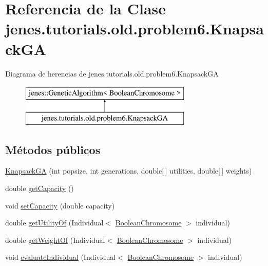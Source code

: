 \hypertarget{classjenes_1_1tutorials_1_1old_1_1problem6_1_1_knapsack_g_a}{\section{Referencia de la Clase jenes.\-tutorials.\-old.\-problem6.\-Knapsack\-G\-A}
\label{classjenes_1_1tutorials_1_1old_1_1problem6_1_1_knapsack_g_a}
}
Diagrama de herencias de jenes.\-tutorials.\-old.\-problem6.\-Knapsack\-G\-A\begin{figure}[H]
\begin{center}
\leavevmode
\includegraphics[height=2.000000cm]{classjenes_1_1tutorials_1_1old_1_1problem6_1_1_knapsack_g_a}
\end{center}
\end{figure}
\subsection*{Métodos públicos}
\begin{DoxyCompactItemize}
\item 
\hyperlink{classjenes_1_1tutorials_1_1old_1_1problem6_1_1_knapsack_g_a_a422824d96285c3b2f61c4fc7b827740b}{Knapsack\-G\-A} (int popsize, int generations, double\mbox{[}$\,$\mbox{]} utilities, double\mbox{[}$\,$\mbox{]} weights)
\item 
double \hyperlink{classjenes_1_1tutorials_1_1old_1_1problem6_1_1_knapsack_g_a_ad781c31a74a81403fed4c9d366debd39}{get\-Capacity} ()
\item 
void \hyperlink{classjenes_1_1tutorials_1_1old_1_1problem6_1_1_knapsack_g_a_a48beb6d0837db170693758d40fa3fcd0}{set\-Capacity} (double capacity)
\item 
double \hyperlink{classjenes_1_1tutorials_1_1old_1_1problem6_1_1_knapsack_g_a_a1afed02357ac8bd62bf23b34132a1c30}{get\-Utility\-Of} (Individual$<$ \hyperlink{classjenes_1_1chromosome_1_1_boolean_chromosome}{Boolean\-Chromosome} $>$ individual)
\item 
double \hyperlink{classjenes_1_1tutorials_1_1old_1_1problem6_1_1_knapsack_g_a_a3fad8fde8f1c75f2f39665b872578551}{get\-Weight\-Of} (Individual$<$ \hyperlink{classjenes_1_1chromosome_1_1_boolean_chromosome}{Boolean\-Chromosome} $>$ individual)
\item 
void \hyperlink{classjenes_1_1tutorials_1_1old_1_1problem6_1_1_knapsack_g_a_a4a5ada923a1c65269c5cea2431865df5}{evaluate\-Individual} (Individual$<$ \hyperlink{classjenes_1_1chromosome_1_1_boolean_chromosome}{Boolean\-Chromosome} $>$ individual)
\end{DoxyCompactItemize}


